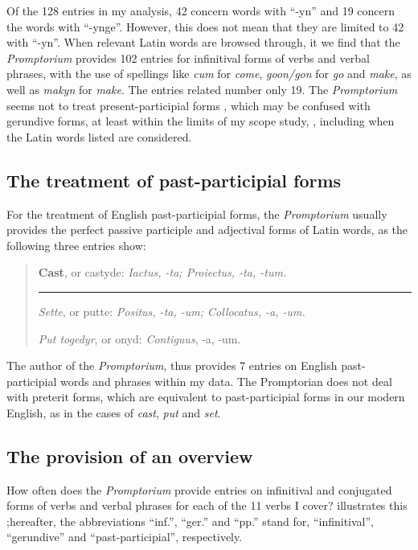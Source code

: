 \documentclass[output=paper,colorlinks,citecolor=brown,arabicfont,chinesefont]{langscibook}
\begin{document}
Of the 128 entries in my analysis, 42 concern words with “-yn” and 19 concern the words with “-ynge”. However, this does not mean that they are limited to 42 with “-yn”. When relevant Latin words are browsed through, it we find that the \emph{Promptorium} provides 102 entries for infinitival forms of verbs and verbal phrases, with the use of spellings like \emph{cum} for \emph{come}, \emph{goon/gon} for \textit{go} and \emph{make}, as well as \emph{makyn} for \emph{make}. The entries related number only 19. The \emph{Promptorium} seems not to treat present-participial forms , which may be confused with gerundive forms, at least within the  limits of my scope study,  , including when the Latin words listed are   considered.

\subsection{The treatment of past-participial forms}

For the treatment of English past-participial forms, the \textit{Promptorium} usually provides the perfect passive participle and adjectival forms of Latin words, as the following three entries show:

\begin{quote}
    \textbf{Cast}, or castyde: \emph{Iactus, -ta; Proiectus, -ta, -tum.}

    \rule{5cm}{.5pt}

    \emph{Sette}, or putte: \emph{Positus, -ta, -um; Collocatus, -a, -um.}

    \emph{Put togedyr}, or onyd: \emph{Contiguus}, -a, -um.
\end{quote}

The author of the \emph{Promptorium}, thus provides 7 entries on English past-participial words and phrases within my data. The Promptorian does not deal with preterit forms, which are equivalent to past-participial forms in our modern English, as in the cases of \emph{cast}, \emph{put} and \emph{set}.

\subsection{The provision of an overview}

How often does the \emph{Promptorium} provide entries on infinitival and conjugated forms of verbs and verbal phrases for each of the 11 verbs I cover?  illustrates this ;hereafter, the abbreviations “inf.”, “ger.” and “pp.” stand for, “infinitival”, “gerundive” and “past-participial”, respectively.
\end{document}
